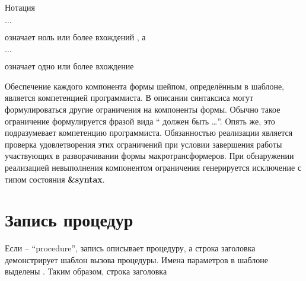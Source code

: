 Нотация
\begin{tabbing}
\qquad {} $\ldots$
\end{tabbing}
означает ноль или более вхождений , а
\begin{tabbing}
\qquad {}  $\ldots$
\end{tabbing}
означает одно или более вхождение \vspace{2mm}

Обеспечение каждого компонента формы шейпом, определённым в шаблоне, является компетенцией
программиста. В описании синтаксиса могут формулироваться другие ограничения на компоненты формы.
Обычно такое ограничение формулируется фразой вида `` должен быть
\ldots''. Опять же, это подразумевает компетенцию программиста. Обязанностью реализации является
проверка удовлетворения этих ограничений при условии завершения работы участвующих в
разворачивании формы макротрансформеров. При обнаружении реализацией невыполнения компонентом
ограничения генерируется исключение с типом состояния {\bfseries\cf\&syntax}.\vspace{2mm}


\section{Запись процедур}

Если  -- ``procedure'', запись описывает процедуру, а строка заголовка
демонстрирует шаблон вызова процедуры. Имена параметров в шаблоне выделены .
Таким образом, строка заголовка\vspace{1mm}


